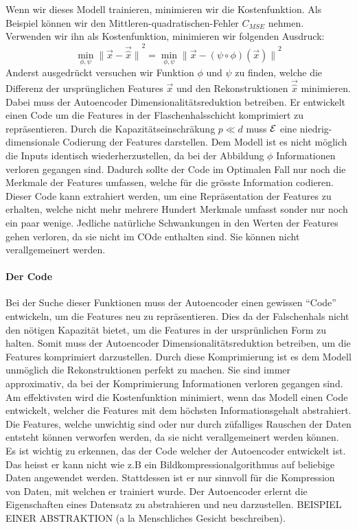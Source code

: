 Wenn wir dieses Modell trainieren, minimieren wir die Kostenfunktion. Als
Beispiel können wir den Mittleren-quadratischen-Fehler $C_{MSE}$ nehmen.
Verwenden wir ihn als Kostenfunktion, minimieren wir folgenden Ausdruck:
\begin{equation}
  \min_{\phi,\psi} {\|\vec{x} - \vec{\hat{x}}\|}^2 = \min_{\phi,\psi} {\|\vec{x} - (\psi \circ \phi)(\vec{x})\|}^2
\end{equation}
Anderst ausgedrückt versuchen wir Funktion $\phi$ und $\psi$ zu finden, welche
die Differenz der ursprünglichen Features $\vec{x}$ und den Rekonstruktionen
$\vec{\hat{x}}$ minimieren. Dabei muss der Autoencoder
Dimensionalitätsreduktion betreiben. Er entwickelt einen Code um die Features
in der Flaschenhalsschicht komprimiert zu repräsentieren. Durch die
Kapazitätseinschräkung $p \ll d$ muss $\mathcal{E}$ eine niedrig-dimensionale
Codierung der Features darstellen. Dem Modell ist es nicht möglich die Inputs
identisch wiederherzustellen, da bei der Abbildung $\phi$ Informationen verloren
gegangen sind. Dadurch sollte der Code im Optimalen Fall nur noch die Merkmale
der Features umfassen, welche für die grösste Information codieren.
Dieser Code kann extrahiert werden, um eine Repräsentation der Features zu
erhalten, welche nicht mehr mehrere Hundert Merkmale umfasst sonder nur noch ein
paar wenige. Jedliche natürliche Schwankungen in den Werten der Features gehen
verloren, da sie nicht im COde enthalten sind. Sie können nicht verallgemeinert werden.

\paragraph{Der Code}
Bei der Suche dieser Funktionen muss der Autoencoder einen gewissen ``Code''
entwickeln, um die Features neu zu repräsentieren. Dies da der Falschenhals
nicht den nötigen Kapazität bietet, um die Features in der ursprünlichen Form
zu halten. Somit muss der Autoencoder Dimensionalitätsreduktion betreiben, um
die Features komprimiert darzustellen.
\para{}
Durch diese Komprimierung ist es dem Modell unmöglich die Rekonstruktionen
perfekt zu machen. Sie sind immer approximativ, da bei der Komprimierung
Informationen verloren gegangen sind. Am effektivsten wird die Kostenfunktion
minimiert, wenn das Modell einen Code entwickelt, welcher die Features mit dem
höchsten Informationsgehalt abstrahiert. Die Features, welche unwichtig sind
oder nur durch züfalliges Rauschen der Daten entsteht können verworfen werden,
da sie nicht verallgemeinert werden können.
\para{}
Es ist wichtig zu erkennen, das der Code welcher der Autoencoder entwickelt
 ist. Das heisst er kann nicht wie z.B ein
Bildkompressionalgorithmus auf beliebige Daten angewendet werden. Stattdessen
ist er nur sinnvoll für die Kompression von Daten, mit welchen er trainiert
wurde. Der Autoencoder erlernt die Eigenschaften eines Datensatz zu abstrahieren
und neu darzustellen.
BEISPIEL EINER ABSTRAKTION (a la Menschliches Gesicht beschreiben).

